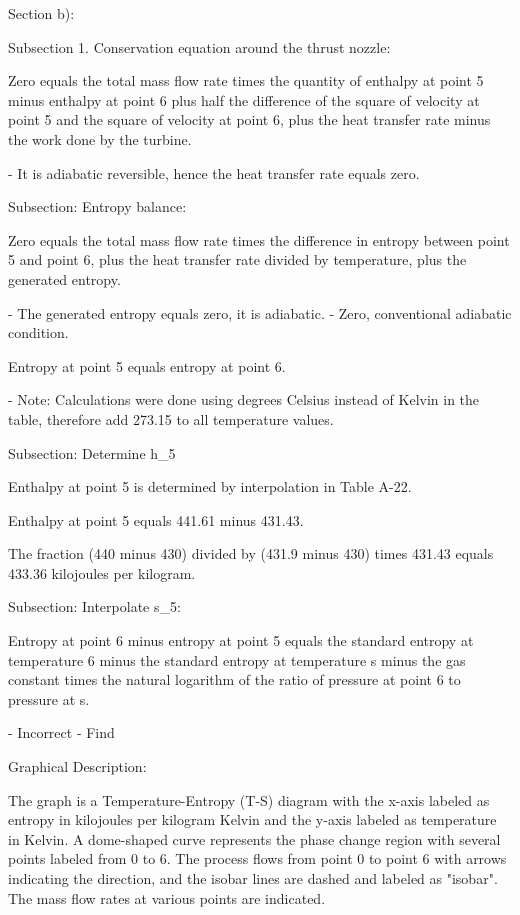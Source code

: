 Section b):

Subsection 1. Conservation equation around the thrust nozzle:

Zero equals the total mass flow rate times the quantity of enthalpy at point 5 minus enthalpy at point 6 plus half the difference of the square of velocity at point 5 and the square of velocity at point 6, plus the heat transfer rate minus the work done by the turbine.

- It is adiabatic reversible, hence the heat transfer rate equals zero.

Subsection: Entropy balance:

Zero equals the total mass flow rate times the difference in entropy between point 5 and point 6, plus the heat transfer rate divided by temperature, plus the generated entropy.

- The generated entropy equals zero, it is adiabatic.
- Zero, conventional adiabatic condition.

Entropy at point 5 equals entropy at point 6.

- Note: Calculations were done using degrees Celsius instead of Kelvin in the table, therefore add 273.15 to all temperature values.

Subsection: Determine h_5

Enthalpy at point 5 is determined by interpolation in Table A-22.

Enthalpy at point 5 equals 441.61 minus 431.43.

The fraction (440 minus 430) divided by (431.9 minus 430) times 431.43 equals 433.36 kilojoules per kilogram.

Subsection: Interpolate s_5:

Entropy at point 6 minus entropy at point 5 equals the standard entropy at temperature 6 minus the standard entropy at temperature s minus the gas constant times the natural logarithm of the ratio of pressure at point 6 to pressure at s.

- Incorrect
- Find

Graphical Description:

The graph is a Temperature-Entropy (T-S) diagram with the x-axis labeled as entropy in kilojoules per kilogram Kelvin and the y-axis labeled as temperature in Kelvin. A dome-shaped curve represents the phase change region with several points labeled from 0 to 6. The process flows from point 0 to point 6 with arrows indicating the direction, and the isobar lines are dashed and labeled as "isobar". The mass flow rates at various points are indicated.

